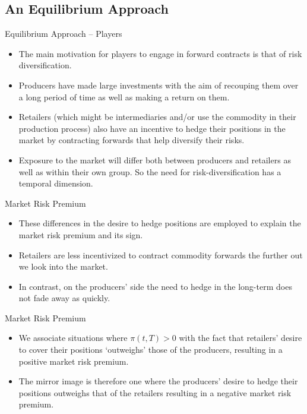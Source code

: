 \subsection{An Equilibrium Approach}


{Equilibrium Approach -- Players}

\begin{itemize}
\item<1->
The main
motivation for players to engage in forward contracts is that of
risk diversification.
\item<2->
Producers have made large investments with the
aim of recouping them over a long period of time as well as making a
return on them.
\item<3->
Retailers (which might be intermediaries and/or use the commodity in
their production process) also have an incentive to hedge their
positions in the market by contracting forwards that help diversify
their risks.
\item<4->
Exposure to the market will differ both between producers and
retailers as well as within their own group.
So the need for risk-diversification has a temporal dimension.
\end{itemize}




{Market Risk Premium}

\begin{itemize}
\item<1-> These differences in the
desire to hedge positions are employed to explain the market risk premium and
its sign.
\item<2-> Retailers are less incentivized to contract commodity forwards
the further out we look into the market.
\item<3-> In contrast, on the producers' side the need to hedge in the long-term
does not fade away as quickly.
\end{itemize}




{Market Risk Premium}
\begin{itemize}
\item<1-> We associate situations where
$\pi(t,T)>0$ with the fact that retailers' desire to cover their
positions `outweighs' those of the producers, resulting in a
positive market risk premium.
\item<2-> The mirror image is therefore one
where the producers' desire to hedge their positions outweighs that
of the retailers resulting in a negative market risk premium.

\end{itemize}





